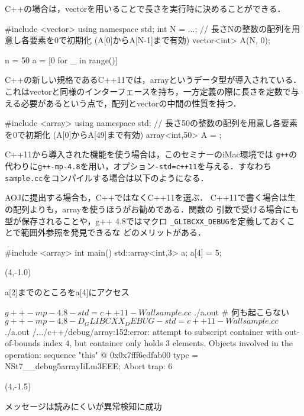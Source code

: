 C++の場合は，vectorを用いることで長さを実行時に決めることができる．
\begin{cbox}[emph={vector}]
#include <vector>
using namespace std;
  int N = ...;
  // 長さNの整数の配列を用意し各要素を0で初期化 (A[0]からA[N-1]まで有効)
  vector<int> A(N, 0);
\end{cbox}

\begin{pybox}
n = 50
a = [0 for _ in range()]
\end{pybox}


C++の新しい規格であるC++11では，arrayというデータ型が導入されている．これはvectorと同様のインターフェースを持ち，一方定義の際に長さを定数で与える必要があるという点で，配列とvectorの中間の性質を持つ．
\begin{c11box}[emph={array}]
#include <array>
using namespace std;
  // 長さ50の整数の配列を用意し各要素を0で初期化 (A[0]からA[49]まで有効)
  array<int,50> A = {}; 
\end{c11box}

C++11から導入された機能を使う場合は，このセミナーのiMac環境では
\texttt{g++}の代わりに\texttt{g++-mp-4.8}を用い，オプション\texttt{-std=c++11}を与える．すなわち\texttt{sample.cc}をコンパイルする場合は以下のようになる．
AOJに提出する場合も，C++ではなくC++11を選ぶ．
C++11で書く場合は生の配列よりも，arrayを使うほうがお勧めである．関数の
引数で受ける場合にも型が保存されることや，g++ 4.8ではマクロ
\texttt{\_GLIBCXX\_DEBUG}を定義しておくことで範囲外参照を発見できるな
どのメリットがある．
\begin{c11box}
#include <array>
int main() {
  std::array<int,3> a;
  a[4] = 5;
}  
\end{c11box}
\begin{textblock}{3.5}(4,-1.0)
\begin{shaded*}
\noindent a[2]までのところをa[4]にアクセス
\end{shaded*}
\end{textblock}
\begin{terminal}
$ g++-mp-4.8 -std=c++11 -Wall sample.cc
$ ./a.out
# 何も起こらない
$ g++-mp-4.8 -D_GLIBCXX_DEBUG -std=c++11 -Wall sample.cc
$ ./a.out
/.../c++/debug/array:152:error: attempt to subscript container
    with out-of-bounds index 4, but container only holds 3    
    elements.
Objects involved in the operation:
sequence "this" @ 0x0x7fff6edfab00 {
  type = NSt7__debug5arrayIiLm3EEE;
}
Abort trap: 6  
\end{terminal}
\begin{textblock}{3.5}(4,-1.5)
\begin{shaded*}
\noindent メッセージは読みにくいが異常検知に成功
\end{shaded*}
\end{textblock}

